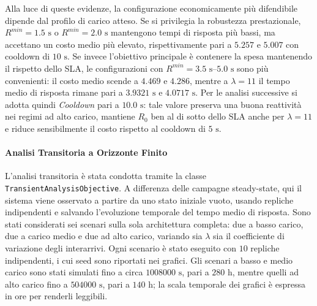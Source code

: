﻿\documentclass[a4paper,12pt]{article}
\begin{document}
Alla luce di queste evidenze, la configurazione economicamente più difendibile dipende dal profilo di carico atteso. Se si privilegia la robustezza prestazionale, $R^{min}=1.5\text{ s}$ o $R^{min}=2.0\text{ s}$ mantengono tempi di risposta più bassi, ma accettano un costo medio più elevato, rispettivamente pari a $5.257$ e $5.007$ con cooldown di $10\text{ s}$. Se invece l'obiettivo principale è contenere la spesa mantenendo il rispetto dello SLA, le configurazioni con $R^{min}=3.5\text{ s}$--$5.0\text{ s}$ sono più convenienti: il costo medio scende a $4.469$ e $4.286$, mentre a $\lambda=11$ il tempo medio di risposta rimane pari a $3.9321\text{ s}$ e $4.0717\text{ s}$. Per le analisi successive si adotta quindi \textit{Cooldown} pari a $10.0\text{ s}$: tale valore preserva una buona reattività nei regimi ad alto carico, mantiene $R_0$ ben al di sotto dello SLA anche per $\lambda=11$ e riduce sensibilmente il costo rispetto al cooldown di $5\text{ s}$.

\paragraph{Analisi Transitoria a Orizzonte Finito}
L'analisi transitoria è stata condotta tramite la classe \texttt{TransientAnalysisObjective}. A differenza delle campagne steady-state, qui il sistema viene osservato a partire da uno stato iniziale vuoto, usando repliche indipendenti e salvando l'evoluzione temporale del tempo medio di risposta. Sono stati considerati sei scenari sulla sola architettura completa: due a basso carico, due a carico medio e due ad alto carico, variando sia $\lambda$ sia il coefficiente di variazione degli interarrivi. Ogni scenario è stato eseguito con $10$ repliche indipendenti, i cui seed sono riportati nei grafici. Gli scenari a basso e medio carico sono stati simulati fino a circa $1008000\text{ s}$, pari a $280\text{ h}$, mentre quelli ad alto carico fino a $504000\text{ s}$, pari a $140\text{ h}$; la scala temporale dei grafici è espressa in ore per renderli leggibili.
\end{document}
